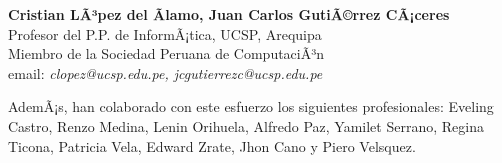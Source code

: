 \begin{center}
\textbf{Cristian LÃ³pez del Ãlamo, Juan Carlos GutiÃ©rrez CÃ¡ceres}\\
Profesor del P.P. de InformÃ¡tica, UCSP, Arequipa\\
Miembro de la Sociedad Peruana de ComputaciÃ³n\\
email: \textit{clopez@ucsp.edu.pe, jcgutierrezc@ucsp.edu.pe}
\end{center}

AdemÃ¡s, han colaborado con este esfuerzo los siguientes profesionales: Eveling Castro, Renzo Medina, Lenin Orihuela, Alfredo Paz, Yamilet Serrano, Regina Ticona, Patricia Vela, Edward Z rate, Jhon Cano y Piero Vel squez.

\newpage
